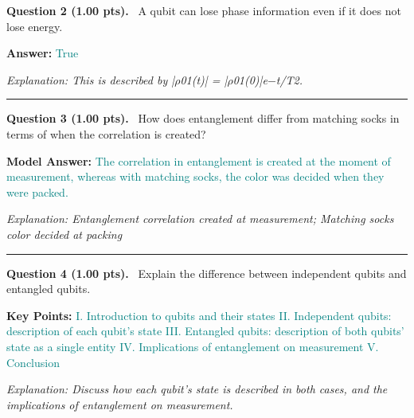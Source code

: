 \documentclass[12pt,a4paper]{article}
\begin{document}
\noindent
\textbf{Question 2 (1.00 pts).}~
A qubit can lose phase information even if it does not lose energy.


\textbf{Answer:} \textcolor{teal}{True}



\textit{\small Explanation: This is described by |\ensuremath{\rho}01(t)| = |\ensuremath{\rho}01(0)|e\ensuremath{-}t/T2.}



\vspace{0.8em}
\noindent\rule{\linewidth}{0.2pt}
\vspace{0.3em}


\noindent
\textbf{Question 3 (1.00 pts).}~
How does entanglement differ from matching socks in terms of when the correlation is created?


\textbf{Model Answer:} \textcolor{teal}{The correlation in entanglement is created at the moment of measurement, whereas with matching socks, the color was decided when they were packed.}



\textit{\small Explanation: Entanglement correlation created at measurement; Matching socks color decided at packing}



\vspace{0.8em}
\noindent\rule{\linewidth}{0.2pt}
\vspace{0.3em}


\noindent
\textbf{Question 4 (1.00 pts).}~
Explain the difference between independent qubits and entangled qubits.


\textbf{Key Points:} \textcolor{teal}{I. Introduction to qubits and their states
II. Independent qubits: description of each qubit's state
III. Entangled qubits: description of both qubits' state as a single entity
IV. Implications of entanglement on measurement
V. Conclusion}



\textit{\small Explanation: Discuss how each qubit's state is described in both cases, and the implications of entanglement on measurement.}
\end{document}
